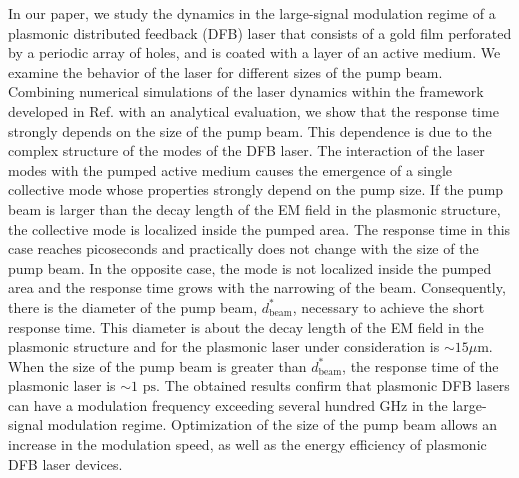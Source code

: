 \documentclass[aps,prapplied,amsmath,amssymb,onecolumn,superscriptaddress,showpacs,floatfix,longbibliography]{revtex4-1}
\begin{document}
In our paper, we study the dynamics in the large-signal modulation regime of a plasmonic distributed feedback (DFB) laser that consists of a gold film perforated by a periodic array of holes, and is coated with a layer of an active medium.
We examine the behavior of the laser for different sizes of the pump beam.
Combining numerical simulations of the laser dynamics within the framework developed in Ref. \cite{Zyablovsky2017approach,nefedkin2018acsphot} with an analytical evaluation, we show that the response time strongly depends on the size of the pump beam.
This dependence is due to the complex structure of the modes of the DFB laser.
The interaction of the laser modes with the pumped active medium causes the emergence of a single collective mode whose properties strongly depend on the pump size.
If the pump beam is larger than the decay length of the EM field in the plasmonic structure, the collective mode is localized inside the pumped area.
The response time in this case reaches picoseconds and practically does not change with the size of the pump beam.
In the opposite case, the mode is not localized inside the pumped area and the response time grows with the narrowing of the beam.
Consequently, there is the diameter of the pump beam, $d_{\text{beam}}^*$, necessary to achieve the short response time. This diameter is about the decay length of the EM field in the plasmonic structure and for the plasmonic laser under consideration is $\sim 15 \mu$m. When the size of the pump beam is greater than $d_{\text{beam}}^*$, the response time of the plasmonic laser is $\sim 1$ $\text{ps}$.
The obtained results confirm that plasmonic DFB lasers can have a modulation frequency exceeding several hundred GHz in the large-signal modulation regime. 
Optimization of the size of the pump beam allows an increase in the modulation speed, as well as the energy efficiency of plasmonic DFB laser devices.
\end{document}
